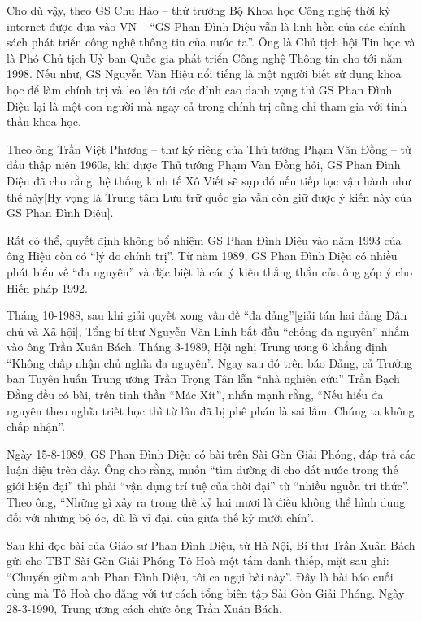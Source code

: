 Cho dù vậy, theo GS Chu Hảo – thứ trưởng Bộ Khoa học Công nghệ thời kỳ internet được đưa vào VN – “GS Phan Đình Diệu vẫn là linh hồn của các chính sách phát triển công nghệ thông tin của nước ta”. Ông là Chủ tịch hội Tin học và là Phó Chủ tịch Uỷ ban Quốc gia phát triển Công nghệ Thông tin cho tới năm 1998.
Nếu như, GS Nguyễn Văn Hiệu nổi tiếng là một người biết sử dụng khoa học để làm chính trị và leo lên tới các đỉnh cao danh vọng thì GS Phan Đình Diệu lại là một con người mà ngay cả trong chính trị cũng chỉ tham gia với tinh thần khoa học.

Theo ông Trần Việt Phương – thư ký riêng của Thủ tướng Phạm Văn Đồng – từ đầu thập niên 1960s, khi được Thủ tướng Phạm Văn Đồng hỏi, GS Phan Đình Diệu đã cho rằng, hệ thống kinh tế Xô Viết sẽ sụp đổ nếu tiếp tục vận hành như thế này[Hy vọng là Trung tâm Lưu trữ quốc gia vẫn còn giữ được ý kiến này của GS Phan Đình Diệu].

Rất có thể, quyết định không bổ nhiệm GS Phan Đình Diệu vào năm 1993 của ông Hiệu còn có “lý do chính trị”. Từ năm 1989, GS Phan Đình Diệu có nhiều phát biểu về “đa nguyên” và đặc biệt là các ý kiến thẳng thắn của ông góp ý cho Hiến pháp 1992.

Tháng 10-1988, sau khi giải quyết xong vấn đề “đa đảng”[giải tán hai đảng Dân chủ và Xã hội], Tổng bí thư Nguyễn Văn Linh bắt đầu “chống đa nguyên” nhắm vào ông Trần Xuân Bách. Tháng 3-1989, Hội nghị Trung ương 6 khẳng định “Không chấp nhận chủ nghĩa đa nguyên”. Ngay sau đó trên báo Đảng, cả Trưởng ban Tuyên huấn Trung ương Trần Trọng Tân lẫn “nhà nghiên cứu” Trần Bạch Đằng đều có bài, trên tinh thần “Mác Xít”, nhấn mạnh rằng, “Nếu hiểu đa nguyên theo nghĩa triết học thì từ lâu đã bị phê phán là sai lầm. Chúng ta không chấp nhận”.

Ngày 15-8-1989, GS Phan Đình Diệu có bài trên Sài Gòn Giải Phóng, đáp trả các luận điệu trên đây. Ông cho rằng, muốn “tìm đường đi cho đất nước trong thế giới hiện đại” thì phải “vận dụng trí tuệ của thời đại” từ “nhiều nguồn tri thức”. Theo ông, “Những gì xảy ra trong thế kỷ hai mươi là điều không thể hình dung đối với những bộ óc, dù là vĩ đại, của giữa thế kỷ mười chín”.

Sau khi đọc bài của Giáo sư Phan Đình Diệu, từ Hà Nội, Bí thư Trần Xuân Bách gửi cho TBT Sài Gòn Giải Phóng Tô Hoà một tấm danh thiếp, mặt sau ghi: “Chuyển giùm anh Phan Đình Diệu, tôi ca ngợi bài này”. Đây là bài báo cuối cùng mà Tô Hoà cho đăng với tư cách tổng biên tập Sài Gòn Giải Phóng. Ngày 28-3-1990, Trung ương cách chức ông Trần Xuân Bách.

